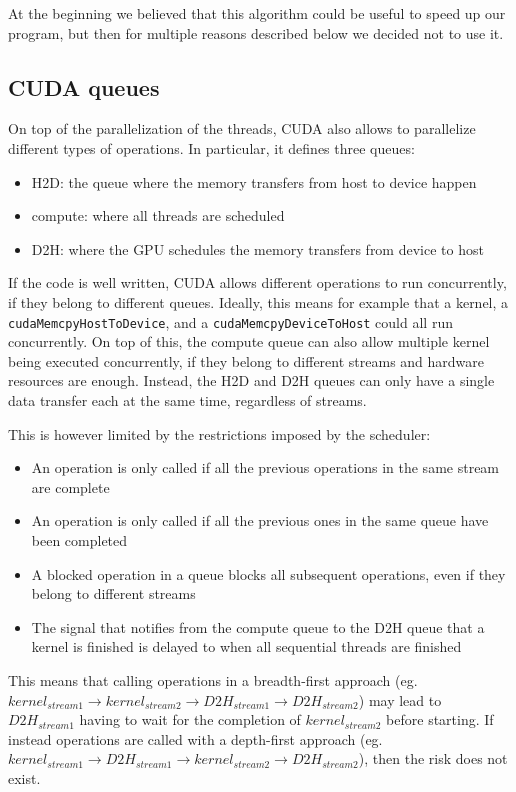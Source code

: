 At the beginning we believed that this algorithm could be useful to speed up our program, but then for multiple reasons described below we decided not to use it.

\subsection{CUDA queues}

On top of the parallelization of the threads, CUDA also allows to parallelize different types of operations.
In particular, it defines three queues:
\begin{itemize}
	\itemsep 0em
	\item H2D: the queue where the memory transfers from host to device happen
	\item compute: where all threads are scheduled
	\item D2H: where the GPU schedules the memory transfers from device to host
\end{itemize}
If the code is well written, CUDA allows different operations to run concurrently, if they belong to different queues.
Ideally, this means for example that a kernel, a \texttt{cudaMemcpyHostToDevice}, and a \texttt{cudaMemcpyDeviceToHost} could all run concurrently.
On top of this, the compute queue can also allow multiple kernel being executed concurrently, if they belong to different streams and hardware resources are enough.
Instead, the H2D and D2H queues can only have a single data transfer each at the same time, regardless of streams.

This is however limited by the restrictions imposed by the scheduler:
\begin{itemize}
	\itemsep 0em
	\item An operation is only called if all the previous operations in the same stream are complete
	\item An operation is only called if all the previous ones in the same queue have been completed
	\item A blocked operation in a queue blocks all subsequent operations, even if they belong to different streams
	\item The signal that notifies from the compute queue to the D2H queue that a kernel is finished is delayed to when all sequential threads are finished
\end{itemize}
This means that calling operations in a breadth-first approach (eg. $kernel_{stream1} \rightarrow kernel_{stream 2} \rightarrow D2H_{stream 1} \rightarrow D2H_{stream 2}$) may lead to $D2H_{stream 1}$ having to wait for the completion of $kernel_{stream 2}$ before starting.
If instead operations are called with a depth-first approach (eg. $kernel_{stream1} \rightarrow D2H_{stream 1}  \rightarrow kernel_{stream 2}\rightarrow D2H_{stream 2}$), then the risk does not exist.

